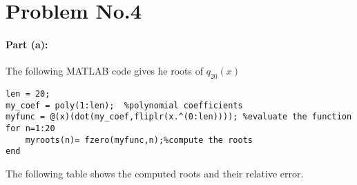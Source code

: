 \section*{Problem No.4} \label{sec:prob4}

\paragraph{Part (a):}

The following MATLAB code gives he roots of $q_{20}(x)$
\begin{lstlisting}
len = 20; 
my_coef = poly(1:len);  %polynomial coefficients 
myfunc = @(x)(dot(my_coef,fliplr(x.^(0:len)))); %evaluate the function
for n=1:20
    myroots(n)= fzero(myfunc,n);%compute the roots 
end
\end{lstlisting}

The following table shows the computed roots and their relative error.

